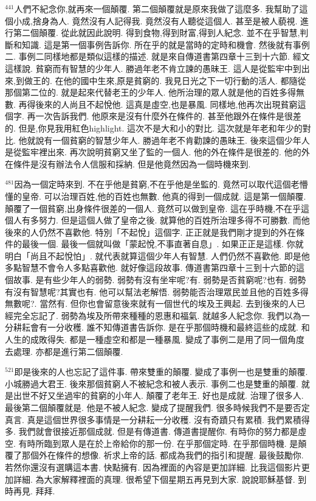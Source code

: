 \documentclass{book}
\begin{document}
$^{441}$人們不紀念你,就再來一個顛覆.
第二個顛覆就是原來我做了這麼多.
我幫助了這個小成,捨身為人.
竟然沒有人記得我.
竟然沒有人聽從這個人.
甚至是被人藐視.
進行第二個顛覆.
從此就因此說明.
得到食物,得到財富,得到人紀念.
並不在乎智慧,判斷和知識.
這是第一個事例告訴你.
所在乎的就是當時的定時和機會.
然後就有事例二.
事例二同樣地都是類似這樣的描述.
就是來自傳道書第四章十三到十六節.
經文這樣說.
貧窮而有智慧的少年人.
勝過年老不肯立諫的愚昧王.
這人是從監牢中到出來,到做王的.
在他的國中生來,原是貧窮的.
我見日光之下一切行動的活人.
都隨從那個第二位的.
就是起來代替老王的少年人.
他所治理的眾人就是他的百姓多得無數.
再得後來的人尚且不起悅他.
這真是虛空,也是暴風.
同樣地,他再次出現貧窮這個字.
再一次告訴我們.
他原來是沒有什麼外在條件的.
甚至他跟外在條件是很差的.
但是,你見我用紅色highlight.
這次不是大和小的對比.
這次就是年老和年少的對比.
他就說有一個貧窮的智慧少年人.
勝過年老不肯勸諫的愚昧王.
後來這個少年人是從監牢裡出來.
再次說明貧窮又坐了監的一個人.
他的外在條件是很差的.
他的外在條件是沒有辦法令人信服和採納.
但是他竟然因為一個時機來到.

$^{481}$因為一個定時來到.
不在乎他是貧窮,不在乎他是坐監的.
竟然可以取代這個老懵懂的皇帝.
可以治理百姓,他的百姓也無數.
他真的得到一個成就.
這是第一個顛覆.
顛覆了一個貧窮,出身條件很差的一個人.
竟然可以做到皇帝.
這在乎時機,不在乎這個人有多努力.
但是這個人做了皇帝之後.
就算他的百姓所治理多得不可勝數.
而他後來的人仍然不喜歡他.
特別「不起悅」這個字.
正正就是我們剛才提到的外在條件的最後一個.
最後一個就叫做「蒙起悅,不事直著自息」.
如果正正是這樣.
你就明白「尚且不起悅怕」.
就代表就算這個少年人有智慧.
人們仍然不喜歡他.
即是他多點智慧不會令人多點喜歡他.
就好像這段故事.
傳道書第四章十三到十六節的這個故事.
是有些少年人的弱勢.
弱勢有沒有坐牢呢?有.
弱勢是否貧窮呢?也有.
弱勢有沒有智慧呢?其實也有.
他可以幫法老解悟.
弱勢能否治理眾民並且他的百姓多得無數呢?.
當然有.
但你也會留意後來就有一個世代的埃及王興起.
去到後來的人已經完全忘記了.
弱勢為埃及所帶來種種的恩惠和福氣.
就越多人紀念你.
我們以為一分耕耘會有一分收穫.
誰不知傳道書告訴你.
是在乎那個時機和最終這些的成就.
和人生的成敗得失.
都是一種虛空和都是一種暴風.
變成了事例二是用了同一個角度去處理.
亦都是進行第二個顛覆.

$^{521}$即是後來的人也忘記了這件事.
帶來雙重的顛覆.
變成了事例一也是雙重的顛覆.
小城勝過大君王.
後來那個貧窮人不被紀念和被人表示.
事例二也是雙重的顛覆.
就是出世不好又坐過牢的貧窮的小年人.
顛覆了老年王.
好也是成就.
治理了很多人.
最後第二個顛覆就是.
他是不被人紀念.
變成了提醒我們.
很多時候我們不是要否定真言.
真是這個世界很多事情是一分耕耘一分收穫.
沒有奇蹟只有累積.
我們累積得多.
我們就會很接近那個成就.
但是有傳道書.
傳道書提醒你.
有時你的努力都是虛空.
有時所臨到眾人是在於上帝給你的那一份.
在乎那個定時.
在乎那個時機.
是顛覆了那個外在條件的想像.
祈求上帝的話.
都成為我們的指引和提醒.
最後鼓勵你.
若然你還沒有選購這本書.
快點擁有.
因為裡面的內容是更加詳細.
比我這個影片更加詳細.
為大家解釋裡面的真理.
很希望下個星期五再見到大家.
說說耶穌基督.
到時再見.
拜拜.
\newpage
\end{document}
